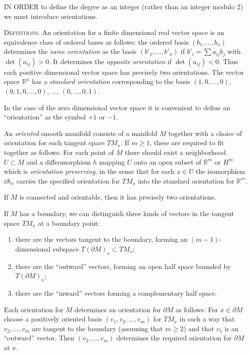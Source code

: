 IN ORDER to define the degree as an integer (rather than an integer modulo 2) we must introduce orientations.

\textsc{Definitions.} An orientation for a finite dimensional real vector space is an equivalence class of ordered bases as follows: the ordered basis $(b_1, \ldots, b_n)$ determines the \emph{same orientation} as the basis $(b'_1, \ldots, b'_n)$ if $b'_i = \sum a_{ij} b_j$ with $\det(a_{ij}) > 0$. It determines the \emph{opposite orientation} if $\det(a_{ij}) < 0$. Thus each positive dimensional vector space has precisely two orientations. The vector space $\mathbb{R}^n$ has a \emph{standard orientation} corresponding to the basis $(1, 0, \ldots, 0)$, $(0, 1, 0, \ldots, 0)$, $\ldots$, $(0, \ldots, 0, 1)$.

In the case of the zero dimensional vector space it is convenient to define an ``orientation'' as the symbol $+1$ or $-1$.

An \emph{oriented} smooth manifold consists of a manifold $M$ together with a choice of orientation for each tangent space $TM_x$. If $m \geq 1$, these are required to fit together as follows: For each point of $M$ there should exist a neighborhood $U \subset M$ and a diffeomorphism $h$ mapping $U$ onto an open subset of $\mathbb{R}^m$ or $H^m$ which is \emph{orientation preserving}, in the sense that for each $x \in U$ the isomorphism $\dd h_x$ carries the specified orientation for $TM_x$ into the standard orientation for $\mathbb{R}^m$.

If $M$ is connected and orientable, then it has precisely two orientations.

If $M$ has a boundary, we can distinguish three kinds of vectors in the tangent space $TM_x$ at a boundary point:
\begin{enumerate}
\item there are the vectors tangent to the boundary, forming an $(m-1)$-dimensional subspace $T(\partial M)_x \subset TM_x$;
\item there are the ``outward'' vectors, forming an open half space bounded by $T(\partial M)_x$;
\item there are the ``inward'' vectors forming a complementary half space.
\end{enumerate}



Each orientation for $M$ determines an orientation for $\partial M$ as follows: For $x \in \partial M$ choose a positively oriented basis $(v_1, v_2, \ldots, v_m)$ for $TM_x$ in such a way that $v_2, \ldots, v_m$ are tangent to the boundary (assuming that $m \geq 2$) and that $v_1$ is an ``outward'' vector. Then $(v_2, \ldots, v_m)$ determines the required orientation for $\partial M$ at $x$.

